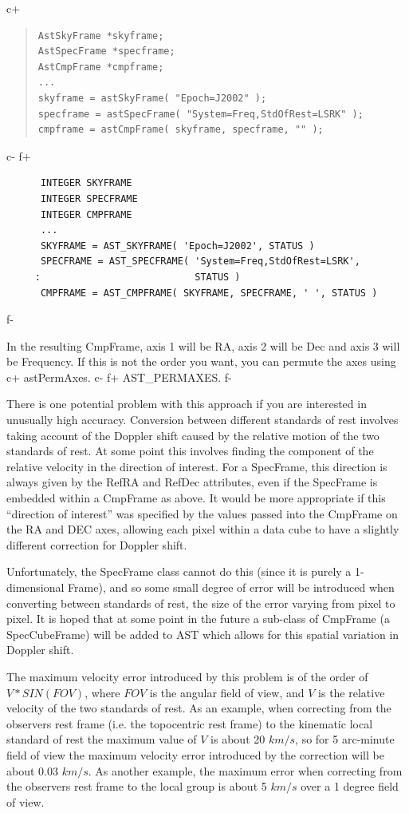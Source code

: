 \documentclass[twoside,11pt]{article}
\begin{document}
c+
\begin{quote}
\small
\begin{verbatim}
AstSkyFrame *skyframe;
AstSpecFrame *specframe;
AstCmpFrame *cmpframe;
...
skyframe = astSkyFrame( "Epoch=J2002" );
specframe = astSpecFrame( "System=Freq,StdOfRest=LSRK" );
cmpframe = astCmpFrame( skyframe, specframe, "" );
\end{verbatim}
\normalsize
\end{quote}
c-
f+
\small
\begin{verbatim}
      INTEGER SKYFRAME
      INTEGER SPECFRAME
      INTEGER CMPFRAME
      ...
      SKYFRAME = AST_SKYFRAME( 'Epoch=J2002', STATUS )
      SPECFRAME = AST_SPECFRAME( 'System=Freq,StdOfRest=LSRK',
     :                           STATUS )
      CMPFRAME = AST_CMPFRAME( SKYFRAME, SPECFRAME, ' ', STATUS )
\end{verbatim}
\normalsize
f-

In the resulting CmpFrame, axis 1 will be RA, axis 2 will be Dec and axis
3 will be Frequency. If this is not the order you want, you can permute
the axes using 
c+
astPermAxes.
c-
f+
AST\_PERMAXES.
f-

There is one potential problem with this approach if you are interested in
unusually high accuracy. Conversion between different standards of rest
involves taking account of the Doppler shift caused by the relative
motion of the two standards of rest. At some point this involves finding
the component of  the relative velocity in the direction of interest.
For a SpecFrame, this direction is always given by the RefRA and RefDec
attributes, even if the SpecFrame is embedded within a CmpFrame as above.
It would be more appropriate if this ``direction of interest'' was
specified by the values passed into the CmpFrame on the RA and DEC axes,
allowing each pixel within a data cube to have a slightly different
correction for Doppler shift.

Unfortunately, the SpecFrame class cannot do this (since it is purely a
1-dimensional Frame), and so some small degree of error will be
introduced when converting between standards of rest, the size of the
error varying from pixel to pixel. It is hoped that at some point in the
future a sub-class of CmpFrame (a SpecCubeFrame) will be added to AST which 
allows for this spatial variation in Doppler shift.

The maximum velocity error introduced by this problem is of the order of
$V*SIN(FOV)$, where $FOV$ is the angular field of view, and $V$ is the
relative velocity of the two standards of rest. As an example, when
correcting from the observers rest frame (i.e. the topocentric rest
frame) to the kinematic local standard of rest the maximum value of $V$
is about 20 $km/s$, so for 5 arc-minute field of view the maximum
velocity error introduced by the correction will be about 0.03 $km/s$. As
another example, the maximum error when correcting from the observers
rest frame to the local group is about 5 $km/s$ over a 1 degree field of
view.
\end{document}
